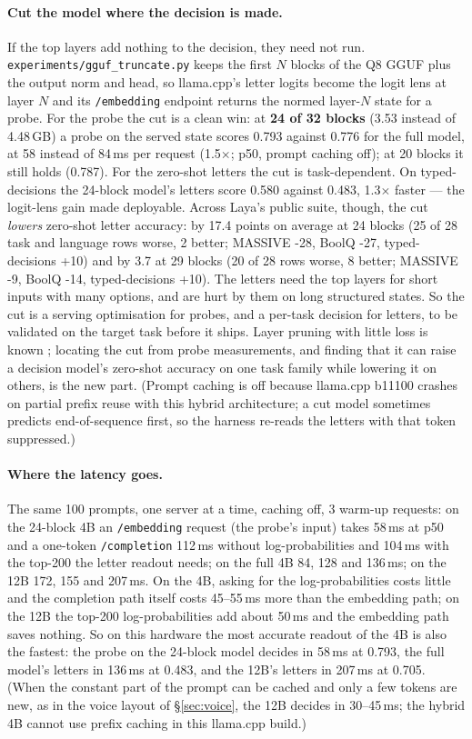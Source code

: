 \documentclass[11pt,a4paper]{article}
\newcommand{\code}[1]{\texttt{#1}}
\begin{document}
\paragraph{Cut the model where the decision is made.} If the top layers add nothing to the decision, they need not run. \code{experiments/gguf\_truncate.py} keeps the first $N$ blocks of the Q8 GGUF plus the output norm and head, so llama.cpp's letter logits become the logit lens at layer $N$ and its \code{/embedding} endpoint returns the normed layer-$N$ state for a probe. For the probe the cut is a clean win: at \textbf{24 of 32 blocks} (3.53 instead of 4.48\,GB) a probe on the served state scores 0.793 against 0.776 for the full model, at 58 instead of 84\,ms per request (1.5$\times$; p50, prompt caching off); at 20 blocks it still holds (0.787). For the zero-shot letters the cut is task-dependent. On typed-decisions the 24-block model's letters score 0.580 against 0.483, 1.3$\times$ faster --- the logit-lens gain made deployable. Across Laya's public suite, though, the cut \emph{lowers} zero-shot letter accuracy: by 17.4 points on average at 24 blocks (25 of 28 task and language rows worse, 2 better; MASSIVE -28, BoolQ -27, typed-decisions +10) and by 3.7 at 29 blocks (20 of 28 rows worse, 8 better; MASSIVE -9, BoolQ -14, typed-decisions +10). The letters need the top layers for short inputs with many options, and are hurt by them on long structured states. So the cut is a serving optimisation for probes, and a per-task decision for letters, to be validated on the target task before it ships. Layer pruning with little loss is known \cite{shortgpt}; locating the cut from probe measurements, and finding that it can raise a decision model's zero-shot accuracy on one task family while lowering it on others, is the new part. (Prompt caching is off because llama.cpp b11100 crashes on partial prefix reuse with this hybrid architecture; a cut model sometimes predicts end-of-sequence first, so the harness re-reads the letters with that token suppressed.)

\paragraph{Where the latency goes.} The same 100 prompts, one server at a time, caching off, 3 warm-up requests: on the 24-block 4B an \code{/embedding} request (the probe's input) takes 58\,ms at p50 and a one-token \code{/completion} 112\,ms without log-probabilities and 104\,ms with the top-200 the letter readout needs; on the full 4B 84, 128 and 136\,ms; on the 12B 172, 155 and 207\,ms. On the 4B, asking for the log-probabilities costs little and the completion path itself costs 45--55\,ms more than the embedding path; on the 12B the top-200 log-probabilities add about 50\,ms and the embedding path saves nothing. So on this hardware the most accurate readout of the 4B is also the fastest: the probe on the 24-block model decides in 58\,ms at 0.793, the full model's letters in 136\,ms at 0.483, and the 12B's letters in 207\,ms at 0.705. (When the constant part of the prompt can be cached and only a few tokens are new, as in the voice layout of \S\ref{sec:voice}, the 12B decides in 30--45\,ms; the hybrid 4B cannot use prefix caching in this llama.cpp build.)
\end{document}
